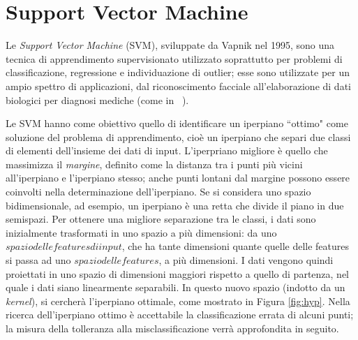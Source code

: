 \documentclass[oneside, openany]{book}
\begin{document}
	\section{Support Vector Machine}
	Le \textit{Support Vector Machine} (SVM), sviluppate da Vapnik nel 1995, sono una tecnica di apprendimento supervisionato utilizzato soprattutto per problemi di classificazione, regressione e individuazione di outlier; esse sono utilizzate per un ampio spettro di applicazioni, dal riconoscimento facciale \cite{bib:svmfr, bib:svmfr2} all'elaborazione di dati biologici per diagnosi mediche (come in ~\cite{bib:svmmed,bib:svmmed2}).
	
	Le SVM hanno come obiettivo quello di identificare un iperpiano ``ottimo" come soluzione del problema di apprendimento, cioè un iperpiano che separi due classi di elementi dell'insieme dei dati di input. L'iperpriano migliore è quello che massimizza il \textit{margine}, definito come la distanza tra i punti più vicini all'iperpiano e l'iperpiano stesso; anche punti lontani dal margine possono essere coinvolti nella determinazione dell'iperpiano. Se si considera uno spazio bidimensionale, ad esempio, un iperpiano è una retta che divide il piano in due semispazi. Per ottenere una migliore separazione tra le classi, i dati sono inizialmente trasformati in uno spazio a più dimensioni: da uno $spazio delle features di input$, che ha tante dimensioni quante quelle delle features si passa ad uno $spazio delle features$, a più dimensioni. I dati vengono quindi proiettati in uno spazio di dimensioni maggiori rispetto a quello di partenza, nel quale i dati siano linearmente separabili. In questo nuovo spazio (indotto da un \textit{kernel}), si cercherà l'iperpiano ottimale, come mostrato in Figura \ref{fig:hyp}. Nella ricerca dell'iperpiano ottimo è accettabile la classificazione errata di alcuni punti; la misura della tolleranza alla misclassificazione verrà approfondita in seguito.
\end{document}
